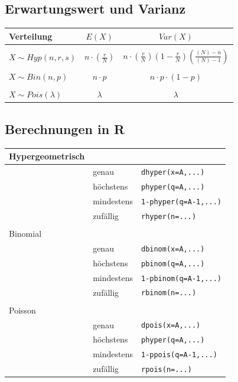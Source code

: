 \subsection{Erwartungswert und Varianz}

\begin{table}[h!]
	\centering
	\begin{tabular}{l c c}
		Verteilung
			& $E(X)$
			& $Var(X)$ \\
		\hline
		& & \\
		$X \sim Hyp(n,r,s)$
			& $n \cdot \left(\frac{r}{N}\right)$
			& $n \cdot \left( 
				\frac{r}{N}
				\right) 
			\left( 
				1 - \frac{r}{N}
			\right)
			\left(
				\frac{(N)-n}{(N)-1}
			\right)$ \\
		& & \\
		$X \sim Bin(n,p)$
			& $n \cdot p$
			& $n \cdot p \cdot (1-p)$ \\
		& & \\
		$X \sim Pois(\lambda)$
			& $\lambda$
			& $\lambda$
	\end{tabular}
\end{table}

\subsection{Berechnungen in R}

\begin{table}[h!]
	\begin{tabular}{l l l}
	Hypergeometrisch & & \\ \hline
		& genau 	& \verb!dhyper(x=A,...)! \\
		& höchstens 	& \verb!phyper(q=A,...)! \\
		& mindestens 	& \verb!1-phyper(q=A-1,...)! \\
		& zufällig 	& \verb!rhyper(n=...)! \\
	& & \\
	Binomial & & \\ \hline
		& genau 	& \verb!dbinom(x=A,...)! \\
		& höchstens 	& \verb!pbinom(q=A,...)! \\
		& mindestens 	& \verb!1-pbinom(q=A-1,...)! \\
		& zufällig 	& \verb!rbinom(n=...)! \\
	& & \\
	Poisson & & \\ \hline
		& genau 	& \verb!dpois(x=A,...)! \\
		& höchstens 	& \verb!phyper(q=A,...)! \\
		& mindestens 	& \verb!1-ppois(q=A-1,...)! \\
		& zufällig 	& \verb!rpois(n=...)! \\
	\end{tabular}
\end{table}

